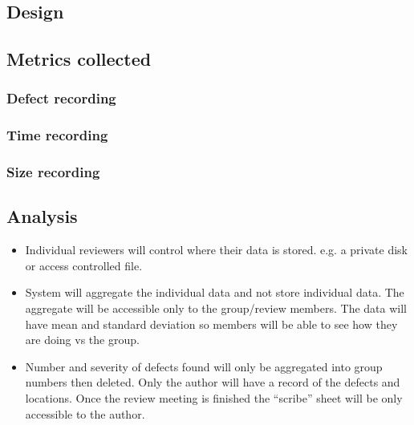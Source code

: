 \subsection{Design}

\subsection{Metrics collected}

\subsubsection{Defect recording}
 
\subsubsection{Time recording}

\subsubsection{Size recording}

\subsection{Analysis}



\begin{itemize}
\item{Individual reviewers will control where their data is stored.  e.g. a
private disk or access controlled file.}
\item{System will aggregate the individual data and not store individual
data.  The aggregate will be accessible only to the group/review members.
The data will have mean and standard deviation so members will be able to
see how they are doing vs the group.}
\item{Number and severity of defects found will only be aggregated into
group numbers then deleted.  Only the author will have a record of the
defects and locations.  Once the review meeting is finished the ``scribe''
sheet will be only accessible to the author.}

\end{itemize} 

